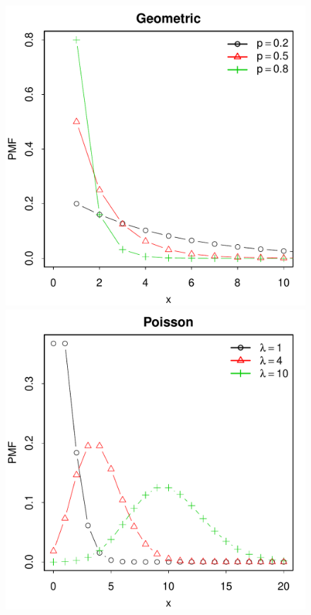 \documentclass[landscape]{article}
\begin{document}
\begin{center}
\begin{figure}[H]
  \includegraphics[scale=0.35]{figs/geometric.pdf}
  \includegraphics[scale=0.35]{figs/poisson.pdf}
\end{figure}

\end{center}
\end{document}
